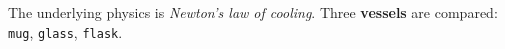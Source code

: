 The underlying physics is \textit{Newton's law of cooling}.
Three \textbf{vessels} are compared: \texttt{mug}, \texttt{glass}, \texttt{flask}.
